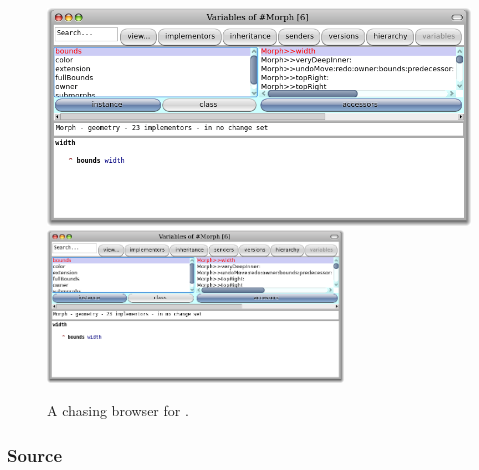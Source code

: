 \documentclass[a4paper,10pt,twoside]{book}
\begin{document}
\begin{figure}[btp]
	\begin{center}
	\ifluluelse
		{\includegraphics[width=\textwidth]{chasingBrowser}}
		{\includegraphics[width=0.7\textwidth]{chasingBrowser}}
	\end{center}
	\caption{A chasing browser for .}
\end{figure}



\subsubsection{Source}
\end{document}
